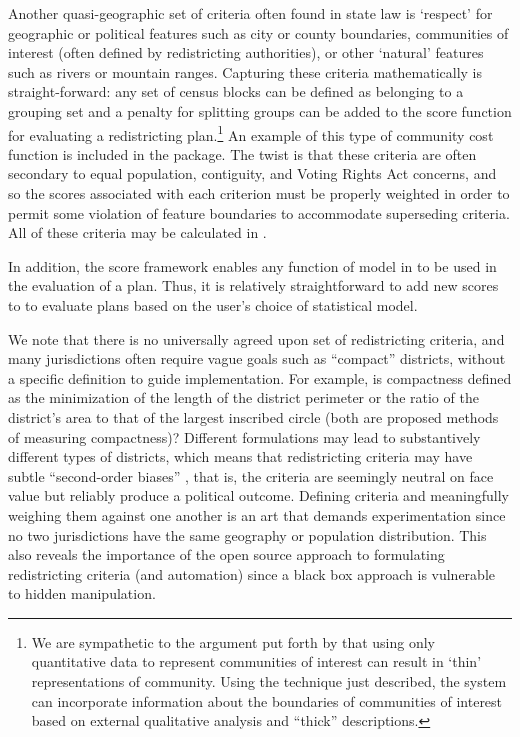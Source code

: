 \documentclass[article]{JSSstyle/jss}
\begin{document}
Another quasi-geographic set of criteria often found in state law is  
`respect' for geographic or political features such as city or county 
boundaries, communities of interest (often defined by redistricting 
authorities), or other `natural'  features such as rivers or mountain ranges.  
Capturing these criteria mathematically is straight-forward: any set 
of census blocks can be defined as belonging to a grouping set and
a penalty for splitting groups can be added to the score function for evaluating a redistricting plan.\footnote{We are sympathetic to the argument put forth by \citet[][]{Forest04} 
that using only quantitative data to represent communities of interest can result
in `thin' representations of community. Using the technique just described, the  system can incorporate
information about the boundaries of communities of interest based on external qualitative 
analysis and ``thick'' descriptions.}  An example of this type of community cost 
function is included in the  package.  The twist is that these criteria are 
often secondary to equal population, contiguity, and Voting Rights Act concerns, and so the scores
associated with each criterion must be properly weighted in order to permit 
some violation of feature boundaries to accommodate superseding criteria.
All of these criteria may be calculated in .

In addition, the  score framework enables any function of model in  to be used in the evaluation of 
a plan. Thus, it is relatively straightforward to add new scores to  to evaluate plans 
based on the user's choice of statistical model.

We note that there is no universally agreed upon set of redistricting criteria, and many jurisdictions
often require vague goals such as ``compact'' districts, without a specific definition to
guide implementation. For example, is compactness defined as the minimization of the 
length of the district perimeter or the ratio of the district's area to that of the largest inscribed circle
(both are proposed methods of measuring compactness)?  Different formulations may lead to substantively
different types of districts, which means that redistricting criteria may have subtle
``second-order biases'' \citep[][]{Parker90}, that is, the criteria are seemingly 
neutral on face value but reliably produce a political outcome.  Defining criteria 
and meaningfully weighing them against one another is an art that demands experimentation 
since no two jurisdictions have the same geography or population distribution.  This 
also reveals the importance of the  open source approach to formulating redistricting criteria (and automation) 
since a black box approach is vulnerable to hidden manipulation.  
\end{document}
